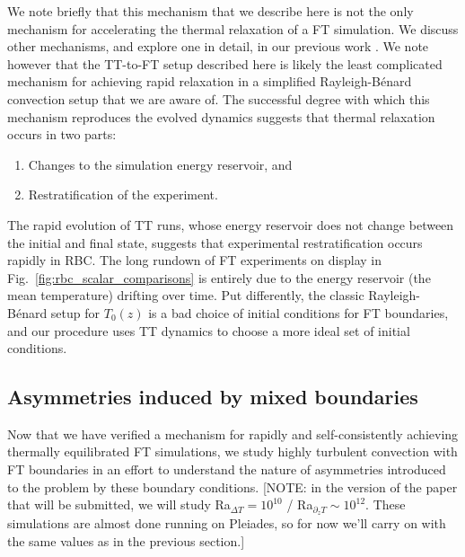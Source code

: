 \documentclass[aps, pre, onecolumn, nofootinbib, notitlepage, groupedaddress, amsfonts, amssymb, amsmath, longbibliography, superscriptaddress]{revtex4-1}
\newcommand{\RB}{Rayleigh-B\'{e}nard }
\begin{document}
We note briefly that this mechanism that we describe here is not the only mechanism for accelerating the thermal relaxation of a FT simulation.
We discuss other mechanisms, and explore one in detail, in our previous work \cite{anders&all2018}.
We note however that the TT-to-FT setup described here is likely the least complicated mechanism for achieving rapid relaxation in a simplified \RB convection setup that we are aware of.
The successful degree with which this mechanism reproduces the evolved dynamics suggests that thermal relaxation occurs in two parts:
\begin{enumerate}
\item Changes to the simulation energy reservoir, and
\item Restratification of the experiment.
\end{enumerate}
The rapid evolution of TT runs, whose energy reservoir does not change between the initial and final state, suggests that experimental restratification occurs rapidly in RBC. 
The long rundown of FT experiments on display in Fig.~\ref{fig:rbc_scalar_comparisons} is entirely due to the energy reservoir (the mean temperature) drifting over time.
Put differently, the classic \RB setup for $T_0(z)$ is a bad choice of initial conditions for FT boundaries, and our procedure uses TT dynamics to choose a more ideal set of initial conditions.

\subsection{Asymmetries induced by mixed boundaries}
\label{sec:asymmetries}
Now that we have verified a mechanism for rapidly and self-consistently achieving thermally equilibrated FT simulations, we study highly turbulent convection with FT boundaries in an effort to understand the nature of asymmetries introduced to the problem by these boundary conditions.
[NOTE: in the version of the paper that will be submitted, we will study Ra$_{\Delta T} = 10^{10}$ / Ra$_{\partial_z T} \sim 10^{12}$. These simulations are almost done running on Pleiades, so for now we'll carry on with the same values as in the previous section.]
\end{document}
